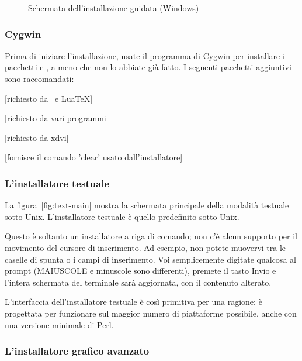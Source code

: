 \documentclass{article}
\begin{document}
\begin{figure}[tb]
\caption{Schermata dell'installazione guidata
  (Windows)}\label{fig:wizard-w32}
\end{figure}


\subsubsection{Cygwin}
\label{sec:cygwin}

Prima di iniziare l'installazione, usate il programma 
di Cygwin per installare i pacchetti  e , a
meno che non lo abbiate già fatto. I seguenti pacchetti aggiuntivi sono
raccomandati:
\begin{itemize*}
\item {} [richiesto da \XeTeX\ e Lua\TeX]
\item {} [richiesto da vari programmi]
\item {} [richiesto da xdvi]
\item {} [fornisce il comando 'clear' usato
  dall'installatore]
\end{itemize*}

\subsubsection{L'installatore testuale}

La figura~\ref{fig:text-main} mostra la schermata principale della
modalità testuale sotto Unix. L'installatore testuale è quello
predefinito sotto Unix.

Questo è soltanto un installatore a riga di comando; non c'è alcun
supporto per il movimento del cursore di inserimento. Ad esempio, non
potete muovervi tra le caselle di spunta o i campi di inserimento.
Voi semplicemente digitate qualcosa al prompt (MAIUSCOLE e minuscole sono
differenti), premete il tasto Invio e l'intera schermata del terminale
sarà aggiornata, con il contenuto alterato.

L'interfaccia dell'installatore testuale è così primitiva per una ragione:
è progettata per funzionare sul maggior numero di piattaforme possibile,
anche con una versione minimale di Perl.

\subsubsection{L'installatore grafico avanzato}
\end{document}
